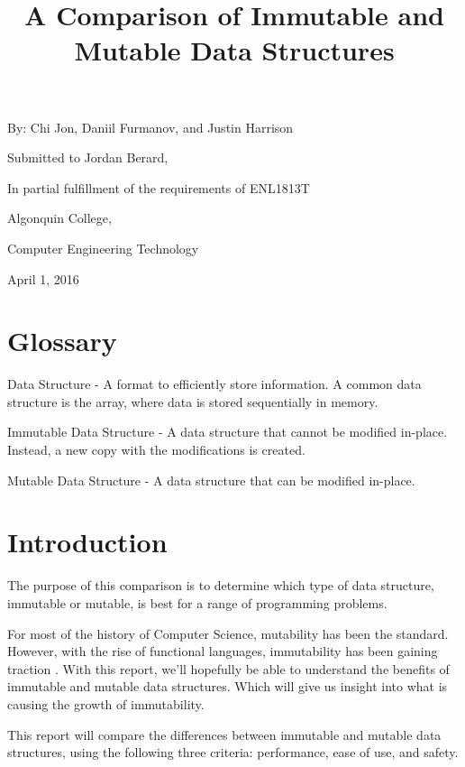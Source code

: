 \documentclass{article}
\title{A Comparison of Immutable and Mutable Data Structures}
\author{}
\date{}
\newcommand{\glossaryentry}[2]{#1 - #2}
\begin{document}
\maketitle

\begin{center}
By:  Chi Jon, Daniil Furmanov, and Justin Harrison

\hfill

Submitted to Jordan Berard,

In partial fulfillment of the requirements of ENL1813T

\hfill

Algonquin College,

Computer Engineering Technology

\hfill

April 1, 2016
\end{center}

\section{Glossary}
\glossaryentry{Data Structure}{
  A format to efficiently store information. A common data
  structure is the array, where data is stored sequentially in memory.
}

\glossaryentry{Immutable Data Structure}{
  A data structure that cannot be modified in-place.
  Instead, a new copy with the modifications is created.
}

\glossaryentry{Mutable Data Structure}{
  A data structure that can be modified in-place.
}

\section{Introduction}
The purpose of this comparison is to determine which type of data structure,
immutable or mutable, is best for a range of programming problems.

For most of the history of Computer Science, mutability has been the standard.
However, with the rise of functional languages, immutability has been gaining
traction \cite{ieee_spectrum}. With this report, we'll hopefully be able to
understand the benefits of immutable and mutable data structures. Which will
give us insight into what is causing the growth of immutability.

This report will compare the differences between immutable and mutable data
structures, using the following three criteria: performance, ease of use, and
safety.
\end{document}

